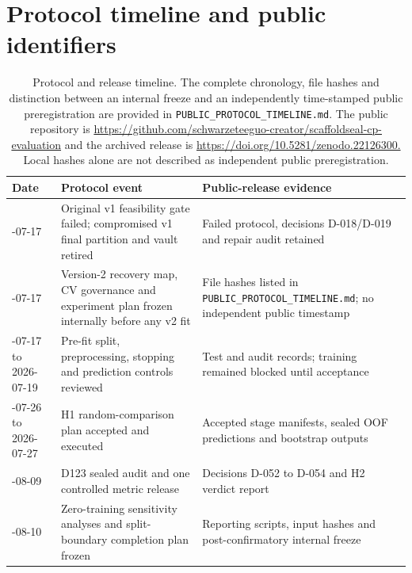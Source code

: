 \documentclass[10pt]{article}
\begin{document}
\section*{Protocol timeline and public identifiers}


\begin{table}[htbp]
\centering
\caption{Protocol and release timeline. The complete chronology, file hashes and distinction between an internal freeze and an independently time-stamped public preregistration are provided in \texttt{PUBLIC\_\allowbreak{}PROTOCOL\_\allowbreak{}TIMELINE.md}. The public repository is \url{https://github.com/schwarzeteeguo-creator/scaffoldseal-cp-evaluation} and the archived release is \url{https://doi.org/10.5281/zenodo.22126300.} Local hashes alone are not described as independent public preregistration.}
\scriptsize
\setlength{\tabcolsep}{3pt}
\renewcommand{\arraystretch}{1.15}
\begin{tabularx}{\textwidth}{>{\raggedright\arraybackslash}p{}>{\raggedright\arraybackslash}X>{\raggedright\arraybackslash}p{}}
\toprule
\textbf{Date} & \textbf{Protocol event} & \textbf{Public-release evidence} \\
\midrule
2026-07-17 & Original v1 feasibility gate failed; compromised v1 final partition and vault retired & Failed protocol, decisions D-018/D-019 and repair audit retained \\
2026-07-17 & Version-2 recovery map, CV governance and experiment plan frozen internally before any v2 fit & File hashes listed in \texttt{PUBLIC\_\allowbreak{}PROTOCOL\_\allowbreak{}TIMELINE.md}; no independent public timestamp \\
2026-07-17 to 2026-07-19 & Pre-fit split, preprocessing, stopping and prediction controls reviewed & Test and audit records; training remained blocked until acceptance \\
2026-07-26 to 2026-07-27 & H1 random-comparison plan accepted and executed & Accepted stage manifests, sealed OOF predictions and bootstrap outputs \\
2026-08-09 & D123 sealed audit and one controlled metric release & Decisions D-052 to D-054 and H2 verdict report \\
2026-08-10 & Zero-training sensitivity analyses and split-boundary completion plan frozen & Reporting scripts, input hashes and post-confirmatory internal freeze \\
\bottomrule
\end{tabularx}
\end{table}
\end{document}

